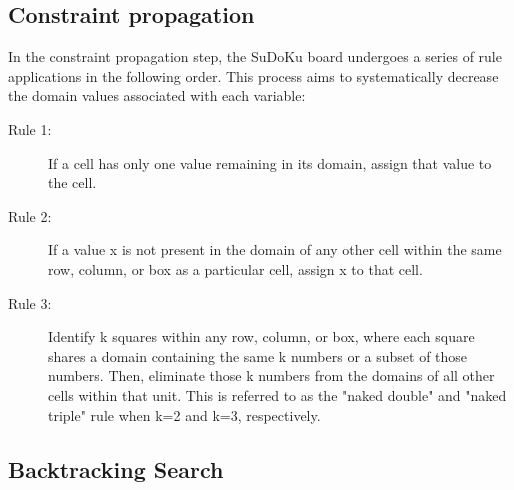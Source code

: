 \documentclass{article}
\begin{document}
\subsection{Constraint propagation}
In the constraint propagation step, the SuDoKu board undergoes a series of rule applications in the following order. This process aims to systematically decrease the domain values associated with each variable:
\begin{description}
  \item[Rule 1:] If a cell has only one value remaining in its domain, assign that value to the cell.
  \item[Rule 2:] If a value x is not present in the domain of any other cell within the same row, column, or box as a particular cell, assign x to that cell.
  \item[Rule 3:] Identify k squares within any row, column, or box, where each square shares a domain containing the same k numbers or a subset of those numbers. Then, eliminate those k numbers from the domains of all other cells within that unit. This is referred to as the "naked double" and "naked triple" rule when k=2 and k=3, respectively.
\end{description}


\label{alg:Constraint Propagation}
 
 
 
   
   
 
 

\subsection{Backtracking Search}
\end{document}
